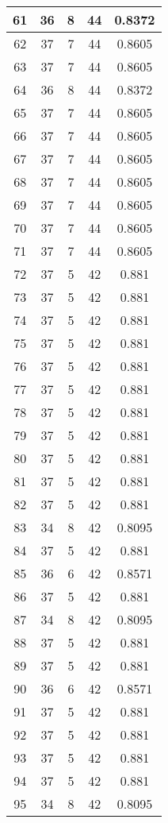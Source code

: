 \documentclass[letterpaper, 12pt]{article}
\begin{document}
\begin{longtable}{|c|c|c|c|c|}
\hline
61 & 36 & 8 & 44 & 0.8372 \\
\hline
62 & 37 & 7 & 44 & 0.8605 \\
\hline
63 & 37 & 7 & 44 & 0.8605 \\
\hline
64 & 36 & 8 & 44 & 0.8372 \\
\hline
65 & 37 & 7 & 44 & 0.8605 \\
\hline
66 & 37 & 7 & 44 & 0.8605 \\
\hline
67 & 37 & 7 & 44 & 0.8605 \\
\hline
68 & 37 & 7 & 44 & 0.8605 \\
\hline
69 & 37 & 7 & 44 & 0.8605 \\
\hline
70 & 37 & 7 & 44 & 0.8605 \\
\hline
71 & 37 & 7 & 44 & 0.8605 \\
\hline
72 & 37 & 5 & 42 & 0.881 \\
\hline
73 & 37 & 5 & 42 & 0.881 \\
\hline
74 & 37 & 5 & 42 & 0.881 \\
\hline
75 & 37 & 5 & 42 & 0.881 \\
\hline
76 & 37 & 5 & 42 & 0.881 \\
\hline
77 & 37 & 5 & 42 & 0.881 \\
\hline
78 & 37 & 5 & 42 & 0.881 \\
\hline
79 & 37 & 5 & 42 & 0.881 \\
\hline
80 & 37 & 5 & 42 & 0.881 \\
\hline
81 & 37 & 5 & 42 & 0.881 \\
\hline
82 & 37 & 5 & 42 & 0.881 \\
\hline
83 & 34 & 8 & 42 & 0.8095 \\
\hline
84 & 37 & 5 & 42 & 0.881 \\
\hline
85 & 36 & 6 & 42 & 0.8571 \\
\hline
86 & 37 & 5 & 42 & 0.881 \\
\hline
87 & 34 & 8 & 42 & 0.8095 \\
\hline
88 & 37 & 5 & 42 & 0.881 \\
\hline
89 & 37 & 5 & 42 & 0.881 \\
\hline
90 & 36 & 6 & 42 & 0.8571 \\
\hline
91 & 37 & 5 & 42 & 0.881 \\
\hline
92 & 37 & 5 & 42 & 0.881 \\
\hline
93 & 37 & 5 & 42 & 0.881 \\
\hline
94 & 37 & 5 & 42 & 0.881 \\
\hline
95 & 34 & 8 & 42 & 0.8095 \\

\end{longtable}
\end{document}
